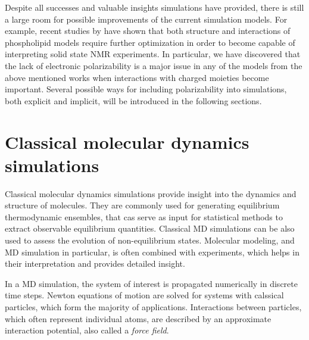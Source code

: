 Despite all successes and valuable insights simulations have provided, 
there is still a large room for possible improvements of the current simulation models. 
For example, recent studies by \citet{botan15, catte16} have shown 
that both structure and interactions of phospholipid models require further optimization 
in order to become capable of interpreting solid state NMR experiments. 
In particular, we have discovered that 
the lack of electronic polarizability is a major issue in any of the models 
from the above mentioned works \citep{botan15, catte16}
when interactions with charged moieties become important. 
Several possible ways for including polarizability into simulations, both explicit and implicit, 
will be introduced in the following sections. 





\section{Classical molecular dynamics simulations}
\label{section:md}

Classical molecular dynamics simulations provide insight into the dynamics and structure of molecules. 
They are commonly used for generating equilibrium thermodynamic ensembles,
that cas serve as input for statistical methods to extract observable equilibrium quantities. 
Classical MD simulations can be also used to assess the evolution of non-equilibrium states.
Molecular modeling, and MD simulation in particular, 
is often combined with experiments,
which helps in their interpretation and provides detailed insight. 

In a MD simulation, the system of interest is propagated numerically in discrete time steps.
Newton equations of motion are solved for systems with calssical particles, which form the majority of applications.
Interactions between particles, which often represent individual atoms, 
are described by an approximate interaction potential, also called a \emph{force field}. 

